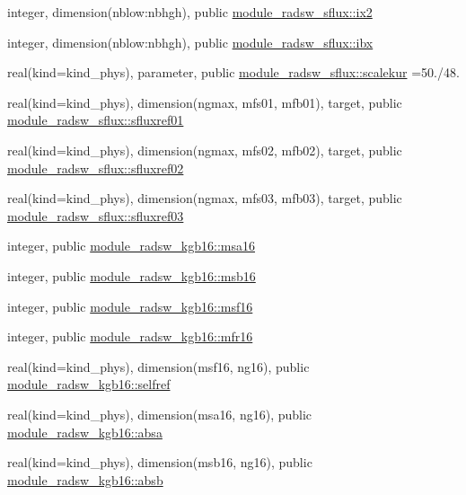 \begin{DoxyCompactItemize}
\item 
integer, dimension(nblow\+:nbhgh), public \hyperlink{namespacemodule__radsw__sflux_a92703c3e826f7e81267c6b7ae31ebe42}{module\+\_\+radsw\+\_\+sflux\+::ix2}
\item 
integer, dimension(nblow\+:nbhgh), public \hyperlink{namespacemodule__radsw__sflux_acb1498ecf044449dbe6d7a5630fdc375}{module\+\_\+radsw\+\_\+sflux\+::ibx}
\item 
real(kind=kind\+\_\+phys), parameter, public \hyperlink{namespacemodule__radsw__sflux_a2f3280a36f27cea89fc66d71e799cf6d}{module\+\_\+radsw\+\_\+sflux\+::scalekur} =50./48.
\item 
real(kind=kind\+\_\+phys), dimension(ngmax, mfs01, mfb01), target, public \hyperlink{namespacemodule__radsw__sflux_a84205f359fb3e1a0e1d03e755c52dc78}{module\+\_\+radsw\+\_\+sflux\+::sfluxref01}
\item 
real(kind=kind\+\_\+phys), dimension(ngmax, mfs02, mfb02), target, public \hyperlink{namespacemodule__radsw__sflux_aa57fca862289bd57327b9c3ef27e3e2f}{module\+\_\+radsw\+\_\+sflux\+::sfluxref02}
\item 
real(kind=kind\+\_\+phys), dimension(ngmax, mfs03, mfb03), target, public \hyperlink{namespacemodule__radsw__sflux_a95d2640cf0e6cf0ba4a8ca1758806e48}{module\+\_\+radsw\+\_\+sflux\+::sfluxref03}
\item 
integer, public \hyperlink{namespacemodule__radsw__kgb16_ad76a9d79e77228ac93ec3db96eed2b29}{module\+\_\+radsw\+\_\+kgb16\+::msa16}
\item 
integer, public \hyperlink{namespacemodule__radsw__kgb16_a2ce1ab36897fb1fc7d85cbf7fe539e59}{module\+\_\+radsw\+\_\+kgb16\+::msb16}
\item 
integer, public \hyperlink{namespacemodule__radsw__kgb16_ab35df3f7d231e98fbef5738119138907}{module\+\_\+radsw\+\_\+kgb16\+::msf16}
\item 
integer, public \hyperlink{namespacemodule__radsw__kgb16_aeee3fe8e44f6fbd9a6a008bc9f97f37c}{module\+\_\+radsw\+\_\+kgb16\+::mfr16}
\item 
real(kind=kind\+\_\+phys), dimension(msf16, ng16), public \hyperlink{namespacemodule__radsw__kgb16_a77d98f3fb766d4abfd494332ce67c2c2}{module\+\_\+radsw\+\_\+kgb16\+::selfref}
\item 
real(kind=kind\+\_\+phys), dimension(msa16, ng16), public \hyperlink{namespacemodule__radsw__kgb16_a51fe40b5f24cc461850fe5be40d18869}{module\+\_\+radsw\+\_\+kgb16\+::absa}
\item 
real(kind=kind\+\_\+phys), dimension(msb16, ng16), public \hyperlink{namespacemodule__radsw__kgb16_afe8639128e4f7a48f133b7399addcb79}{module\+\_\+radsw\+\_\+kgb16\+::absb}

\end{DoxyCompactItemize}
